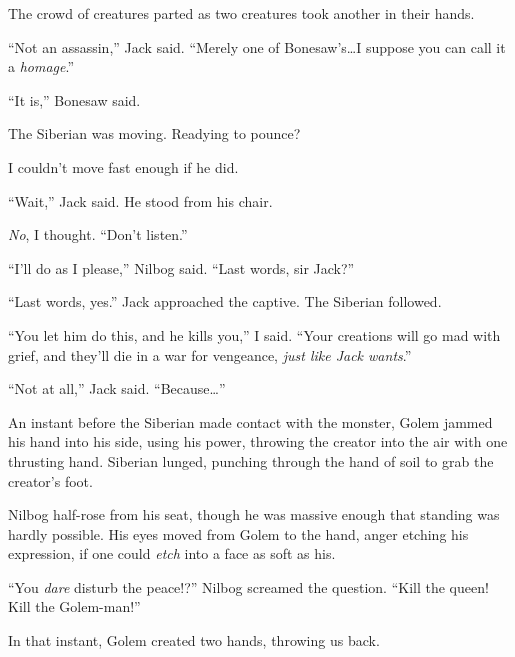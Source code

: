 The crowd of creatures parted as two creatures took another in their hands.



``Not an assassin,'' Jack said.  ``Merely one of Bonesaw's\ldots I suppose you can call it a \emph{homage}.''



``It is,'' Bonesaw said.



The Siberian was moving.  Readying to pounce?



I couldn't move fast enough if he did.



``Wait,'' Jack said.  He stood from his chair.



\emph{No}, I thought.  ``Don't listen.''



``I'll do as I please,'' Nilbog said.  ``Last words, sir Jack?''



``Last words, yes.''  Jack approached the captive.  The Siberian followed.



``You let him do this, and he kills you,'' I said.  ``Your creations will go mad with grief, and they'll die in a war for vengeance, \emph{just like Jack wants}.''



``Not at all,'' Jack said.  ``Because\ldots''



An instant before the Siberian made contact with the monster, Golem jammed his hand into his side, using his power, throwing the creator into the air with one thrusting hand.  Siberian lunged, punching through the hand of soil to grab the creator's foot.



Nilbog half-rose from his seat, though he was massive enough that standing was hardly possible.  His eyes moved from Golem to the hand, anger etching his expression, if one could \emph{etch} into a face as soft as his.



``You \emph{dare} disturb the peace!?'' Nilbog screamed the question. ``Kill the queen!  Kill the Golem-man!''



In that instant, Golem created two hands, throwing us back.




